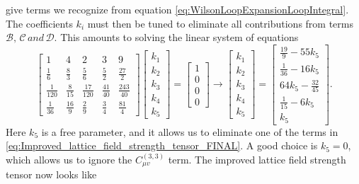 \documentclass[a4paper,10pt]{article}
\begin{document}
give terms we recognize from equation \eqref{eq:WilsonLoopExpansionLoopIntegral}.
The coefficients $k_i$ must then be tuned to eliminate all contributions from terms $\mathscr{B},\,\mathscr{C}\,and\,\mathscr{D}$. This amounts to solving the linear system of equations 
\begin{equation}
\left[\begin{array}{ccccc}
1 & 4 & 2 & 3 & 9 \\
\frac{1}{6} & \frac{8}{3} & \frac{5}{6} & \frac{5}{2} & \frac{27}{2} \\
\frac{1}{120} & \frac{8}{15} & \frac{17}{120} & \frac{41}{40} & \frac{243}{40} \\
\frac{1}{36} & \frac{16}{9} & \frac{2}{9} & \frac{3}{4} & \frac{81}{4}
\end{array}\right]\left[\begin{array}{l}
k_{1} \\
k_{2} \\
k_{3} \\
k_{4} \\
k_{5}
\end{array}\right]=\left[\begin{array}{c}
1 \\
0 \\
0 \\
0
\end{array}\right] \rightarrow \left[\begin{array}{l}
k_{1} \\
k_{2} \\
k_{3} \\
k_{4} \\
k_{5}
\end{array}\right] = \left[\begin{array}{l}
\frac{19}{9}-55 k_{5} \\
\frac{1}{36}-16 k_{5} \\
64 k_{5}-\frac{32}{45} \\
\frac{1}{15}-6 k_{5} \\
k_{5}
\end{array}\right].
\end{equation}
Here $k_{5}$ is a free parameter, and it allows us to eliminate one of the terms in \eqref{eq:Improved_lattice_field_strength_tensor_FINAL}. A good choice is $k_{5} = 0$, which allows us to ignore the $C_{\mu v}^{(3,3)}$ term. The improved lattice field strength tensor now looks like  
\end{document}
